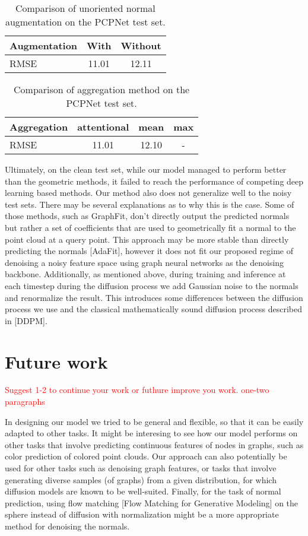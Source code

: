 \documentclass{acmart}
\begin{document}
\begin{table}[ht]
  \centering
  \caption{Comparison of unoriented normal augmentation on the PCPNet test set.}
  \label{tab:augmentation_comparison}
  \begin{tabular}{lcc}
  \hline
  \textbf{Augmentation} & \textbf{With} & \textbf{Without} \\ \hline
  RMSE & 11.01 & 12.11 \\ \hline
  \end{tabular}
  \end{table}
\begin{table}[ht]
  \centering
  \caption{Comparison of aggregation method on the PCPNet test set.}
  \label{tab:aggregation_comparison}
  \begin{tabular}{lccc}
  \hline
  \textbf{Aggregation} & \textbf{attentional} & \textbf{mean} & \textbf{max} \\ \hline
  RMSE & 11.01 & 12.10 & - \\ \hline
  \end{tabular}
  \end{table}
Ultimately, on the clean test set, while our model managed to perform better than the geometric methods, it failed to reach the performance of competing deep learning based methods. Our method also does not generalize well to the noisy test sets. There may be several explanations as to why this is the case. Some of those methods, such as GraphFit, don't directly output the predicted normals but rather a set of coefficients that are used to geometrically fit a normal to the point cloud at a query point. This approach may be more stable than directly predicting the normals [AdaFit], however it does not fit our proposed regime of denoising a noisy feature space using graph neural networks as the denoising backbone. Additionally, as mentioned above, during training and inference at each timestep during the diffusion process we add Gaussian noise to the normals and renormalize the result. This introduces some differences between the diffusion process we use and the classical mathematically sound diffusion process described in [DDPM].


\section{Future work}
\textcolor{red}{Suggest 1-2 to continue your work or futhure improve you work.
one-two paragraphs}

In designing our model we tried to be general and flexible, so that it can be easily adapted to other tasks. It might be interesing to see how our model performs on other tasks that involve predicting continuous features of nodes in graphs, such as color prediction of colored point clouds. Our approach can also potentially be used for other tasks such as denoising graph features, or tasks that involve generating diverse samples (of graphs) from a given distribution, for which diffusion models are known to be well-suited.
Finally, for the task of normal prediction, using flow matching [Flow Matching for Generative Modeling] on the sphere instead of diffusion with normalization might be a more appropriate method for denoising the normals.
\end{document}
